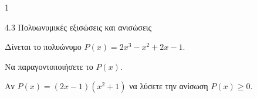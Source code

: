 \begin{ylh}{1}
\item 4.3 Πολυωνυμικές εξισώσεις και ανισώσεις
\end{ylh}
Δίνεται το πολυώνυμο $P(x) = 2x^3 - x^2 + 2x - 1$.
\begin{alist}
\item Να παραγοντοποιήσετε το $P(x)$.
\item Αν $P(x) = (2x - 1)(x^2 + 1)$ να λύσετε την ανίσωση $P(x) \ge 0$.
\end{alist}

